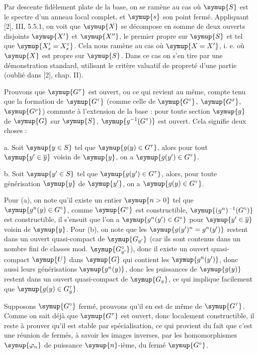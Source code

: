 Par descente fidèlement plate de la base, on se ramène au cas où $\symup{S}$ est le
spectre d'un anneau local complet, et $\symup{s}$ son point fermé. Appliquant [2], III,
5.5.1, on voit que $\symup{X}$ se décompose en somme de deux ouverts disjoints $\symup{X'}$ et
$\symup{X''}$, le premier propre sur $\symup{S}$ et tel que $\symup{X'_s=X_s^\circ}$. Cela nous ramène
au cas où $\symup{X=X'}$, i. e. où $\symup{X}$ est propre sur $\symup{S}$. Dans ce cas on s'en tire par
une démonstration standard, utilisant le critère valuatif de propreté d'une
partie (oublié dans [2], chap. II).

Prouvons que $\symup{G^\tau}$ est ouvert, ou ce qui revient au même, compte tenu que la
formation de $\symup{G^\tau}$ (comme celle de $\symup{G^\circ}$, $\symup{G^\sigma}$, $\symup{G^\rho}$) commute
à l'extension de la base : pour toute section $\symup{g}$ de $\symup{G}$ sur $\symup{S}$,
$\symup{g^{-1}(G^\tau)}$ est ouvert. Cela signifie deux choses :

\medskip
\noindent a. Soit $\symup{y\in S}$ tel que $\symup{g(y)\in G^\tau}$, alors pour tout
$\symup{y'\in\overline{y}}$ voisin de $\symup{y}$, on a $\symup{g(y')\in G^\tau}$.

\medskip
\noindent b. Soit $\symup{y'\in S}$ tel que $\symup{g(y')\in G^\tau}$, alors, pour toute
générisation $\symup{y}$ de $\symup{y'}$, on a $\symup{g(y)\in G^\tau}$.

Pour (a), on note qu'il existe un entier $\symup{n>0}$ tel que
$\symup{g^n(y)\in G^\circ}$, comme $\symup{G^\circ}$ est constructible,
$\symup{(g^n)^{-1}(G^\circ)}$ est constructible, il s'ensuit que l'on a
$\symup{g^n(y')\in G^\circ}$ pour $\symup{y'\in\overline{y}}$ voisin de $\symup{y}$. Pour
(b), on note que les $\symup{g(y')^n=g^n(y')}$ restent dans un ouvert quasi-compact de
$\symup{G_{y'}}$ (car ils sont contenus dans un nombre fini de classes mod.
$\symup{G_{y'}^\circ}$), donc il existe un ouvert quasi-compact $\symup{U}$ dans $\symup{G}$ qui
contient les $\symup{g^n(y')}$, donc aussi leurs générisations $\symup{g^n(y)}$, donc les
puissances de $\symup{g(y)}$ restent dans un ouvert quasi-compact de $\symup{G_y}$, ce qui
implique facilement que $\symup{g(y)\in G_y^\tau}$.

Supposons $\symup{G^\circ}$ fermé, prouvons qu'il en est de même de $\symup{G^\tau}$. Comme on
sait déjà que $\symup{G^\tau}$ est ouvert, donc localement constructible, il reste à
prouver qu'il est stable par spécialisation, ce qui provient du fait que c'est
une réunion de fermés, à savoir les images inverses, par les homomorphismes
$\symup{\varphi_n}$ de puissance $\symup{n}$-ième, du fermé $\symup{G^\circ}$.

